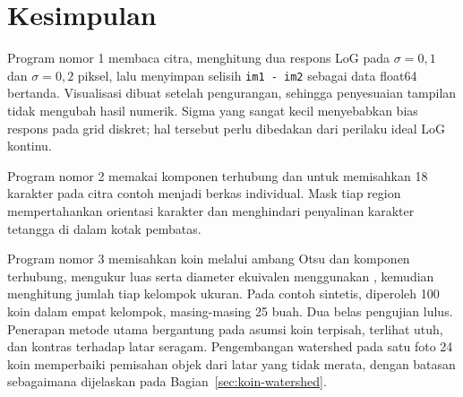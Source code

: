 \section{Kesimpulan}
Program nomor 1 membaca citra, menghitung dua respons LoG pada
$\sigma=0{,}1$ dan $\sigma=0{,}2$ piksel, lalu menyimpan selisih
\texttt{im1 - im2} sebagai data float64 bertanda. Visualisasi dibuat setelah
pengurangan, sehingga penyesuaian tampilan tidak mengubah hasil numerik.
Sigma yang sangat kecil menyebabkan bias respons pada grid diskret;
hal tersebut perlu dibedakan dari perilaku ideal LoG kontinu.

Program nomor 2 memakai komponen terhubung dan 
untuk memisahkan 18 karakter pada citra contoh menjadi berkas individual.
Mask tiap region mempertahankan orientasi karakter dan menghindari
penyalinan karakter tetangga di dalam kotak pembatas.

Program nomor 3 memisahkan koin melalui ambang Otsu dan komponen
terhubung, mengukur luas serta diameter ekuivalen menggunakan
, kemudian menghitung jumlah tiap kelompok ukuran.
Pada contoh sintetis, diperoleh 100 koin dalam empat kelompok, masing-masing
25 buah. Dua belas pengujian lulus. Penerapan metode utama bergantung pada asumsi koin
terpisah, terlihat utuh, dan kontras terhadap latar seragam.
Pengembangan watershed pada satu foto 24 koin memperbaiki pemisahan
objek dari latar yang tidak merata, dengan batasan sebagaimana dijelaskan
pada Bagian~\ref{sec:koin-watershed}.

